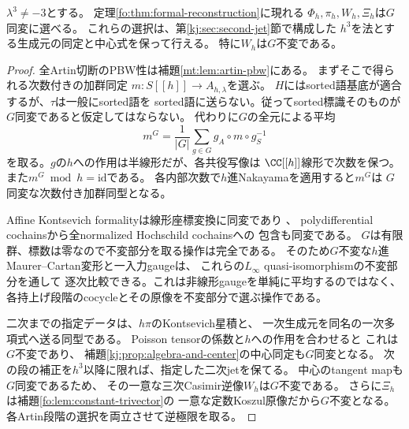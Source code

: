 \begin{lemma}[有限群同変なformalityデータ]
\label{mnf:lem:equivariant-formality}
$\lambda^3\ne-3$とする。
定理\ref{fo:thm:formal-reconstruction}に現れる
$\Phi_h,\pi_h,W_h,\Xi_h$は$G$同変に選べる。
これらの選択は、第\ref{kj:sec:second-jet}節で構成した
$h^3$を法とする生成元の同定と中心式を保って行える。
特に$W_h$は$G$不変である。
\end{lemma}
\begin{proof}
全Artin切断のPBW性は補題\ref{mt:lem:artin-pbw}にある。
まずそこで得られる次数付きの加群同定
$m:S[[h]]\to A_{h,\lambda}$を選ぶ。
$H$にはsorted語基底が適合するが、$\tau$は一般にsorted語を
sorted語に送らない。従ってsorted標識そのものが
$G$同変であると仮定してはならない。
代わりに$G$の全元による平均
\[
 m^G=\frac1{|G|}\sum_{g\in G}g_A\circ m\circ g_S^{-1}
\]
を取る。$g$の$h$への作用は半線形だが、各共役写像は
$\CC[[h]]$線形で次数を保つ。また$m^G\bmod h=\mathrm{id}$である。
各内部次数で$h$進Nakayamaを適用すると$m^G$は
$G$同変な次数付き加群同型となる。

Affine Kontsevich formalityは線形座標変換に同変であり
\cite[Section~6]{PKontsevich}\cite{MNFDolgushev}、
polydifferential cochainsから全normalized Hochschild cochainsへの
包含も同変である。
$G$は有限群、標数は零なので不変部分を取る操作は完全である。
そのため$G$不変な$h$進Maurer--Cartan変形と一入力gaugeは、
これらの$L_\infty$ quasi-isomorphismの不変部分を通して
逐次比較できる。これは非線形gaugeを単純に平均するのではなく、
各持上げ段階のcocycleとその原像を不変部分で選ぶ操作である。

二次までの指定データは、$h\pi$のKontsevich星積と、
一次生成元を同名の一次多項式へ送る同型である。
Poisson tensorの係数と$h$への作用を合わせると
これは$G$不変であり、
補題\ref{kj:prop:algebra-and-center}の中心同定も$G$同変となる。
次の段の補正を$h^3$以降に限れば、指定した二次jetを保てる。
中心のtangent mapも$G$同変であるため、
その一意な三次Casimir逆像$W_h$は$G$不変である。
さらに$\Xi_h$は補題\ref{fo:lem:constant-trivector}の
一意な定数Koszul原像だから$G$不変となる。
各Artin段階の選択を両立させて逆極限を取る。
\end{proof}

